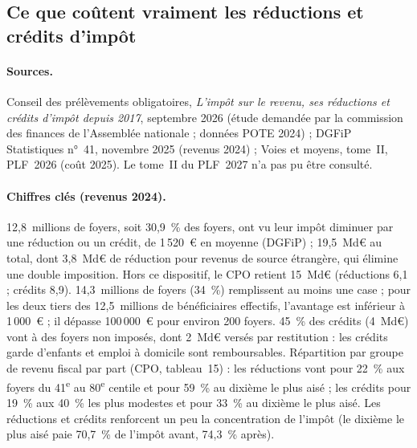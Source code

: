\subsection{Ce que coûtent vraiment les réductions et crédits d'impôt}

\paragraph{Sources.} Conseil des prélèvements obligatoires, \emph{L'impôt sur le revenu, ses réductions et crédits d'impôt depuis 2017}, septembre 2026 (étude demandée par la commission des finances de l'Assemblée nationale ; données POTE 2024) ; DGFiP Statistiques n°~41, novembre 2025 (revenus 2024) ; Voies et moyens, tome~II, PLF~2026 (coût 2025). Le tome~II du PLF~2027 n'a pas pu être consulté.

\paragraph{Chiffres clés (revenus 2024).} 12,8~millions de foyers, soit 30,9~\% des foyers, ont vu leur impôt diminuer par une réduction ou un crédit, de 1\,520~€ en moyenne (DGFiP) ; 19,5~Md€ au total, dont 3,8~Md€ de réduction pour revenus de source étrangère, qui élimine une double imposition. Hors ce dispositif, le CPO retient 15~Md€ (réductions 6,1 ; crédits 8,9). 14,3~millions de foyers (34~\%) remplissent au moins une case ; pour les deux tiers des 12,5~millions de bénéficiaires effectifs, l'avantage est inférieur à 1\,000~€ ; il dépasse 100\,000~€ pour environ 200 foyers. 45~\% des crédits (4~Md€) vont à des foyers non imposés, dont 2~Md€ versés par restitution : les crédits garde d'enfants et emploi à domicile sont remboursables. Répartition par groupe de revenu fiscal par part (CPO, tableau~15) : les réductions vont pour 22~\% aux foyers du 41\textsuperscript{e} au 80\textsuperscript{e} centile et pour 59~\% au dixième le plus aisé ; les crédits pour 19~\% aux 40~\% les plus modestes et pour 33~\% au dixième le plus aisé. Les réductions et crédits renforcent un peu la concentration de l'impôt (le dixième le plus aisé paie 70,7~\% de l'impôt avant, 74,3~\% après).

